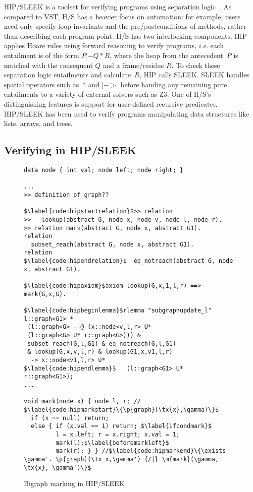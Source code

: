 HIP/SLEEK is a toolset for verifying programs using separation logic~\cite{chin:hipsleek}.  As compared to VST, H/S has a heavier focus on automation: for example, users need only specify loop invariants and the pre/postconditions of methods, rather than describing each program point.  H/S has two interlocking components.  HIP applies Hoare rules using forward reasoning to verify programs, \emph{i.e.} each entailment is of the form $P |- Q * R$, where the heap from the antecedent~$P$ is matched with the consequent $Q$ and a frame/residue $R$. To check these separation logic entailments and calculate~$R$, HIP calls SLEEK.  SLEEK handles spatial operators such as~$*$ and $|->$ before handing any remaining pure entailments to a variety of external solvers such as Z3.  One of H/S's distinguishing features is support for user-defined recursive predicates.  HIP/SLEEK has been used to verify programs manipulating data structures like lists, arrays, and trees.

\subsection{Verifying  in HIP/SLEEK}
\label{sec:hipsleekmark}

\begin{figure}[t]
  \begin{lstlisting}
data node { int val; node left; node right; }

...
>> definition of graph??

$\label{code:hipstartrelation}$>> relation 
>>   lookup(abstract G, node x, node v, node l, node r).
>> relation mark(abstract G, node x, abstract G1).
relation
  subset_reach(abstract G, node x, abstract G1).
relation
$\label{code:hipendrelation}$  eq_notreach(abstract G, node x, abstract G1).

$\label{code:hipaxiom}$axiom lookup(G,x,1,l,r) ==> mark(G,x,G).

$\label{code:hipbeginlemma}$rlemma "subgraphupdate_l" l::graph<G1> *
 (l::graph<G> --@ (x::node<v,l,r> U*
 (l::graph<G> U* r::graph<G>))) &
 subset_reach(G,l,G1) & eq_notreach(G,l,G1)
 & lookup(G,x,v,l,r) & lookup(G1,x,v1,l,r)
  -> x::node<v1,l,r> U*
$\label{code:hipendlemma}$   (l::graph<G1> U* r::graph<G1>);
...

void mark(node x) { node l, r; // $\label{code:hipmarkstart}\{\p{graph}(\tx{x},\gamma)\}$
  if (x == null) return;
  else { if (x.val == 1) return; $\label{ifcondmark}$
         l = x.left; r = x.right; x.val = 1;
         mark(l);$\label{beforemarkleft}$
         mark(r); } } //$\label{code:hipmarkend}\{\exists \gamma'. \p{graph}(\tx x,\gamma') {/|} \m{mark}(\gamma, \tx{x}, \gamma')\}$
\end{lstlisting}
\caption{Bigraph marking in HIP/SLEEK}
\label{fig:hipmarkgraph}
\end{figure}

